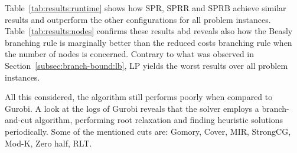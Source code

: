 \documentclass[runningheads]{llncs}
\begin{document}
Table~\ref{tab:results:runtime} shows how SPR, SPRR and SPRB achieve similar results and outperform the other configurations for all problem instances. Table~\ref{tab:results:nodes} confirms these results abd reveals also how the Beasly branching rule is marginally better than the reduced costs branching rule when the number of nodes is concerned. Contrary to what was observed in Section~\ref{subsec:branch-bound:lb}, LP yields the worst results over all problem instances. 

All this considered, the algorithm still performs poorly when compared to Gurobi. A look at the logs of Gurobi reveals that the solver employs a branch-and-cut algorithm, performing root relaxation and finding heuristic solutions periodically. Some of the mentioned cuts are: Gomory, Cover, MIR, StrongCG, Mod-K, Zero half, RLT.
\end{document}
